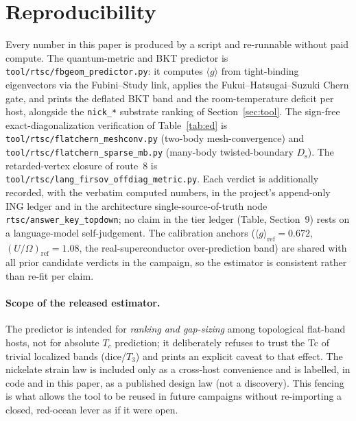 \documentclass[11pt,a4paper]{article}
\newcommand{\qgg}{\langle g \rangle}
\newcommand{\Ds}{D_{\mathrm{s}}}
\begin{document}
\section{Reproducibility}
\label{sec:repro}
Every number in this paper is produced by a script and re-runnable without paid compute. The
quantum-metric and BKT predictor is \texttt{tool/rtsc/fbgeom\_predictor.py}: it computes $\qgg$ from
tight-binding eigenvectors via the Fubini--Study link, applies the Fukui--Hatsugai--Suzuki Chern
gate, and prints the deflated BKT band and the room-temperature deficit per host, alongside the
\texttt{nick\_*} substrate ranking of Section~\ref{sec:tool}. The sign-free exact-diagonalization
verification of Table~\ref{tab:ed} is \texttt{tool/rtsc/flatchern\_meshconv.py} (two-body
mesh-convergence) and \texttt{tool/rtsc/flatchern\_sparse\_mb.py} (many-body twisted-boundary
$\Ds$). The retarded-vertex closure of route~8 is \texttt{tool/rtsc/lang\_firsov\_offdiag\_metric.py}.
Each verdict is additionally recorded, with the verbatim computed numbers, in the project's
append-only ING ledger and in the architecture single-source-of-truth node
\texttt{rtsc/answer\_key\_topdown}; no claim in the tier ledger (Table, Section~9) rests on a
language-model self-judgement. The calibration anchors ($\qgg_{\mathrm{ref}}=0.672$,
$(U/\Omega)_{\mathrm{ref}}=1.08$, the real-superconductor over-prediction band) are shared with all
prior candidate verdicts in the campaign, so the estimator is consistent rather than re-fit per
claim.

\paragraph{Scope of the released estimator.}
The predictor is intended for \emph{ranking and gap-sizing} among topological flat-band hosts, not
for absolute $T_c$ prediction; it deliberately refuses to trust the Tc of trivial localized bands
(dice/$T_3$) and prints an explicit caveat to that effect. The nickelate strain law is included only
as a cross-host convenience and is labelled, in code and in this paper, as a published design law
(not a discovery). This fencing is what allows the tool to be reused in future campaigns without
re-importing a closed, red-ocean lever as if it were open.
\end{document}
